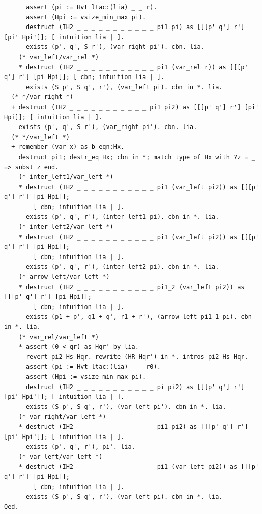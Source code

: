\documentclass[10pt,a4paper]{article}
\begin{document}
\begin{lstlisting}
      assert (pi := Hvt ltac:(lia) _ _ r).
      assert (Hpi := vsize_min_max pi).
      destruct (IH2 _ _ _ _ _ _ _ _ _ _ _ pi1 pi) as [[[p' q'] r'] [pi' Hpi']]; [ intuition lia | ].
      exists (p', q', S r'), (var_right pi'). cbn. lia.
    (* var_left/var_rel *)
    * destruct (IH2 _ _ _ _ _ _ _ _ _ _ _ pi1 (var_rel r)) as [[[p' q'] r'] [pi Hpi]]; [ cbn; intuition lia | ].
      exists (S p', S q', r'), (var_left pi). cbn in *. lia.
  (* */var_right *)
  + destruct (IH2 _ _ _ _ _ _ _ _ _ _ _ pi1 pi2) as [[[p' q'] r'] [pi' Hpi]]; [ intuition lia | ].
    exists (p', q', S r'), (var_right pi'). cbn. lia.
  (* */var_left *)
  + remember (var x) as b eqn:Hx.
    destruct pi1; destr_eq Hx; cbn in *; match type of Hx with ?z = _ => subst z end.
    (* inter_left1/var_left *)
    * destruct (IH2 _ _ _ _ _ _ _ _ _ _ _ pi1 (var_left pi2)) as [[[p' q'] r'] [pi Hpi]];
        [ cbn; intuition lia | ].
      exists (p', q', r'), (inter_left1 pi). cbn in *. lia.
    (* inter_left2/var_left *)
    * destruct (IH2 _ _ _ _ _ _ _ _ _ _ _ pi1 (var_left pi2)) as [[[p' q'] r'] [pi Hpi]];
        [ cbn; intuition lia | ].
      exists (p', q', r'), (inter_left2 pi). cbn in *. lia.
    (* arrow_left/var_left *)
    * destruct (IH2 _ _ _ _ _ _ _ _ _ _ _ pi1_2 (var_left pi2)) as [[[p' q'] r'] [pi Hpi]];
        [ cbn; intuition lia | ].
      exists (p1 + p', q1 + q', r1 + r'), (arrow_left pi1_1 pi). cbn in *. lia.
    (* var_rel/var_left *)
    * assert (0 < qr) as Hqr' by lia.
      revert pi2 Hs Hqr. rewrite (HR Hqr') in *. intros pi2 Hs Hqr.
      assert (pi := Hvt ltac:(lia) _ _ r0).
      assert (Hpi := vsize_min_max pi).
      destruct (IH2 _ _ _ _ _ _ _ _ _ _ _ pi pi2) as [[[p' q'] r'] [pi' Hpi']]; [ intuition lia | ].
      exists (S p', S q', r'), (var_left pi'). cbn in *. lia.
    (* var_right/var_left *)
    * destruct (IH2 _ _ _ _ _ _ _ _ _ _ _ pi1 pi2) as [[[p' q'] r'] [pi' Hpi']]; [ intuition lia | ].
      exists (p', q', r'), pi'. lia.
    (* var_left/var_left *)
    * destruct (IH2 _ _ _ _ _ _ _ _ _ _ _ pi1 (var_left pi2)) as [[[p' q'] r'] [pi Hpi]];
        [ cbn; intuition lia | ].
      exists (S p', S q', r'), (var_left pi). cbn in *. lia.
Qed.
\end{lstlisting}
\end{document}
